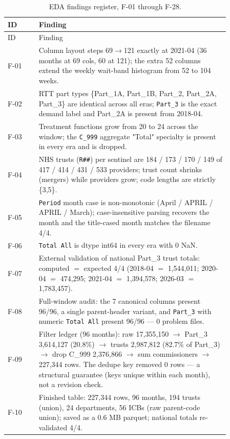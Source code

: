 \documentclass[11pt,a4paper]{article}
\begin{document}
\begin{longtable}{@{}l p{0.86\linewidth}@{}}
\caption{EDA findings register, F-01 through F-28.}\label{tab:findings}\\
\toprule
ID & Finding \\
\midrule
\endfirsthead
\toprule
ID & Finding \\
\midrule
\endhead
\bottomrule
\endlastfoot
F-01 & Column layout steps 69$\rightarrow$121 exactly at 2021-04 (36 months at 69 cols, 60 at 121); the extra 52 columns extend the weekly wait-band histogram from 52 to 104 weeks. \\
F-02 & RTT part types \{Part\_1A, Part\_1B, Part\_2, Part\_2A, Part\_3\} are identical across all eras; \texttt{Part\_3} is the exact demand label and Part\_2A is present from 2018-04. \\
F-03 & Treatment functions grow from 20 to 24 across the window; the \texttt{C\_999} aggregate "Total" specialty is present in every era and is dropped. \\
F-04 & NHS trusts (\texttt{R\#\#}) per sentinel are 184 / 173 / 170 / 149 of 417 / 414 / 431 / 533 providers; trust count shrinks (mergers) while providers grow; code lengths are strictly \{3,5\}. \\
F-05 & \texttt{Period} month case is non-monotonic (April / APRIL / APRIL / March); case-insensitive parsing recovers the month and the title-cased month matches the filename 4/4. \\
F-06 & \texttt{Total All} is dtype int64 in every era with 0 NaN. \\
F-07 & External validation of national Part\_3 trust totals: computed $=$ expected 4/4 (2018-04 $=$ 1{,}544{,}011; 2020-04 $=$ 474{,}295; 2021-04 $=$ 1{,}394{,}578; 2026-03 $=$ 1{,}783{,}457). \\
F-08 & Full-window audit: the 7 canonical columns present 96/96, a single parent-header variant, and \texttt{Part\_3} with numeric \texttt{Total All} present 96/96 --- 0 problem files. \\
F-09 & Filter ledger (96 months): raw 17{,}355{,}150 $\rightarrow$ Part\_3 3{,}614{,}127 (20.8\%) $\rightarrow$ trusts 2{,}987{,}812 (82.7\% of Part\_3) $\rightarrow$ drop C\_999 2{,}376{,}866 $\rightarrow$ sum commissioners $\rightarrow$ 227{,}344 rows. The dedupe key removed 0 rows --- a structural guarantee (keys unique within each month), not a revision check. \\
F-10 & Finished table: 227{,}344 rows, 96 months, 194 trusts (union), 24 departments, 56 ICBs (raw parent-code union); saved as a 0.6 MB parquet; national totals re-validated 4/4. \\

\end{longtable}
\end{document}
